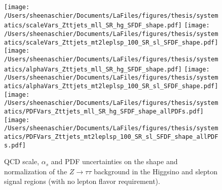 \documentclass[11pt, oneside]{article}   	%
\begin{document}
  \begin{figure}
  \centering
   \texttt{[image: /Users/sheenaschier/Documents/LaFiles/figures/thesis/systematics/scaleVars\_Zttjets\_mll\_SR\_hg\_SFDF\_shape.pdf]}
  \texttt{[image: /Users/sheenaschier/Documents/LaFiles/figures/thesis/systematics/scaleVars\_Zttjets\_mt2leplsp\_100\_SR\_sl\_SFDF\_shape.pdf]}
 \texttt{[image: /Users/sheenaschier/Documents/LaFiles/figures/thesis/systematics/alphaVars\_Zttjets\_mll\_SR\_hg\_SFDF\_shape.pdf]}
 \texttt{[image: /Users/sheenaschier/Documents/LaFiles/figures/thesis/systematics/alphaVars\_Zttjets\_mt2leplsp\_100\_SR\_sl\_SFDF\_shape.pdf]}
  \texttt{[image: /Users/sheenaschier/Documents/LaFiles/figures/thesis/systematics/PDFVars\_Zttjets\_mll\_SR\_hg\_SFDF\_shape\_allPDFs.pdf]}
  \texttt{[image: /Users/sheenaschier/Documents/LaFiles/figures/thesis/systematics/PDFVars\_Zttjets\_mt2leplsp\_100\_SR\_sl\_SFDF\_shape\_allPDFs.pdf]}
\caption{QCD scale, $\alpha_{s}$ and PDF uncertainties on the shape and normalization of the $Z\to\tau\tau$ background in the Higgsino and slepton signal regions (with no lepton flavor requirement).}
\label{fig:theoryUncsZtt}
 \end{figure}
 
\end{document}
